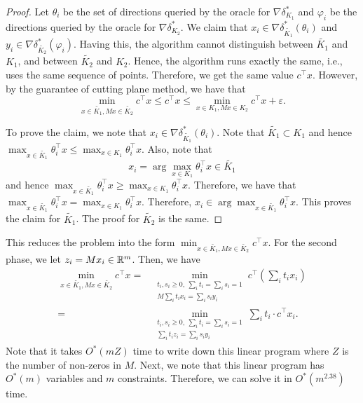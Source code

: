 \begin{proof}
Let $\theta_{i}$ be the set of directions queried by the oracle for
$\nabla\delta^{*}_{K_{1}}$ and $\varphi_{i}$ be the directions queried
by the oracle for $\nabla\delta^{*}_{K_{2}}$. We claim that $x_{i}\in\nabla\delta^{*}_{\widetilde{K_{1}}}(\theta_{i})$
and $y_{i}\in\nabla\delta^{*}_{\widetilde{K_{2}}}(\varphi_{i})$.
Having this, the algorithm cannot distinguish between $\widetilde{K_{1}}$
and $K_{1}$, and between $\widetilde{K_{2}}$ and $K_{2}$. Hence,
the algorithm runs exactly the same, i.e., uses the same sequence
of points. Therefore, we get the same value $c^{\top}x$. However,
by the guarantee of cutting plane method, we have that
\[
\min_{x\in\widetilde{K_{1}},Mx\in\widetilde{K_{2}}}c^{\top}x\leq c^{\top}x\leq\min_{x\in K_{1},Mx\in K_{2}}c^{\top}x+\varepsilon.
\]

To prove the claim, we note that $x_{i}\in\nabla\delta^{*}_{\widetilde{K_{1}}}(\theta_{i})$.
Note that $\widetilde{K_{1}}\subset K_{1}$ and hence $\max_{x\in\widetilde{K_{1}}}\theta^{\top}_{i}x\leq\max_{x\in K_{1}}\theta^{\top}_{i}x$.
Also, note that 
\[
x_{i}=\arg\max_{x\in K_{1}}\theta^{\top}_{i}x\in\widetilde{K_{1}}
\]
and hence $\max_{x\in\widetilde{K_{1}}}\theta^{\top}_{i}x\geq\max_{x\in K_{1}}\theta^{\top}_{i}x$.
Therefore, we have that $\max_{x\in\widetilde{K_{1}}}\theta^{\top}_{i}x=\max_{x\in K_{1}}\theta^{\top}_{i}x$.
Therefore, $x_{i}\in\arg\max_{x\in\widetilde{K_{1}}}\theta^{\top}_{i}x$.
This proves the claim for $\widetilde{K_{1}}$. The proof for $\widetilde{K_{2}}$
is the same.
\end{proof}
This reduces the problem into the form $\min_{x\in\widetilde{K_{1}},Mx\in\widetilde{K_{2}}}c^{\top}x$.
For the second phase, we let $z_{i}=Mx_{i}\in\mathbb{R}^{m}$. Then, we have
\begin{align*}
\min_{x\in\widetilde{K_{1}},Mx\in\widetilde{K_{2}}}c^{\top}x= & \min_{\substack{t_{i},s_{i}\geq0,\ \sum_{i}t_{i}=\sum_{i}s_{i}=1\\
M\sum_{i}t_{i}x_{i}=\sum_{i}s_{i}y_{i}
}
}c^{\top}(\sum_{i}t_{i}x_{i})\\
= & \min_{\substack{t_{i},s_{i}\geq0,\ \sum_{i}t_{i}=\sum_{i}s_{i}=1\\
\sum_{i}t_{i}z_{i}=\sum_{i}s_{i}y_{i}
}
}\sum_{i}t_{i}\cdot c^{\top}x_{i}.
\end{align*}
Note that it takes $O^{*}(mZ)$ time to write down this linear program
where $Z$ is the number of non-zeros in $M$. Next, we note that
this linear program has $O^{*}(m)$ variables and $m$ constraints.
Therefore, we can solve it in $O^{*}(m^{2.38})$ time. 

